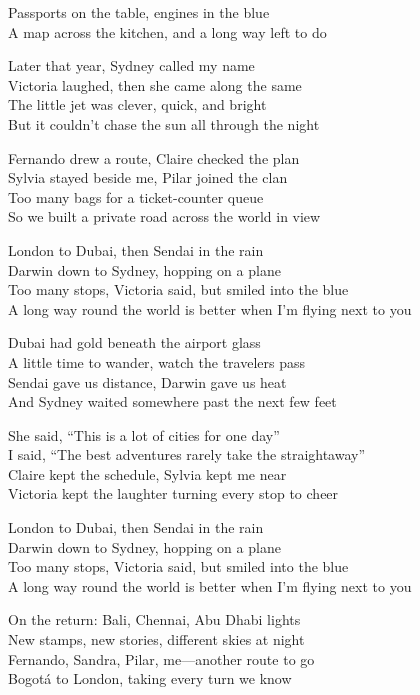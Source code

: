 \begin{lyrics}
Passports on the table, engines in the blue\\
A map across the kitchen, and a long way left to do

Later that year, Sydney called my name\\
Victoria laughed, then she came along the same\\
The little jet was clever, quick, and bright\\
But it couldn't chase the sun all through the night

Fernando drew a route, Claire checked the plan\\
Sylvia stayed beside me, Pilar joined the clan\\
Too many bags for a ticket-counter queue\\
So we built a private road across the world in view

London to Dubai, then Sendai in the rain\\
Darwin down to Sydney, hopping on a plane\\
Too many stops, Victoria said, but smiled into the blue\\
A long way round the world is better when I'm flying next to you

Dubai had gold beneath the airport glass\\
A little time to wander, watch the travelers pass\\
Sendai gave us distance, Darwin gave us heat\\
And Sydney waited somewhere past the next few feet

She said, “This is a lot of cities for one day”\\
I said, “The best adventures rarely take the straightaway”\\
Claire kept the schedule, Sylvia kept me near\\
Victoria kept the laughter turning every stop to cheer

London to Dubai, then Sendai in the rain\\
Darwin down to Sydney, hopping on a plane\\
Too many stops, Victoria said, but smiled into the blue\\
A long way round the world is better when I'm flying next to you

On the return: Bali, Chennai, Abu Dhabi lights\\
New stamps, new stories, different skies at night\\
Fernando, Sandra, Pilar, me—another route to go\\
Bogotá to London, taking every turn we know


\end{lyrics}
